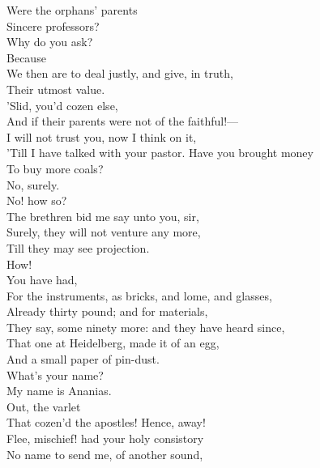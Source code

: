 \documentclass[a4paper,oneside]{memoir}
\begin{document}
\begin{drama*}
\ananiasspeaks {} Were the orphans' parents\\
Sincere professors?\\
\subtlespeaks {} Why do you ask?\\
\ananiasspeaks {} Because\\
We then are to deal justly, and give, in truth,\\
Their utmost value.\\
\subtlespeaks {} 'Slid, you'd cozen else,\\
And if their parents were not of the faithful!---\\
I will not trust you, now I think on it,\\
'Till I have talked with your pastor. Have you brought money\\
To buy more coals?\\
\ananiasspeaks {} No, surely.\\
\subtlespeaks {} No! how so?\\
\ananiasspeaks The brethren bid me say unto you, sir,\\
Surely, they will not venture any more,\\
Till they may see projection.\\
\subtlespeaks {} How!\\
\ananiasspeaks {} You have had,\\
For the instruments, as bricks, and lome, and glasses,\\
Already thirty pound; and for materials,\\
They say, some ninety more: and they have heard since,\\
That one at Heidelberg, made it of an egg,\\
And a small paper of pin-dust.\\
\subtlespeaks {} What's your name?\\
\ananiasspeaks My name is Ananias.\\
\subtlespeaks {} Out, the varlet\\
That cozen'd the apostles! Hence, away!\\
Flee, mischief! had your holy consistory\\
No name to send me, of another sound,\\

\end{drama*}
\end{document}
